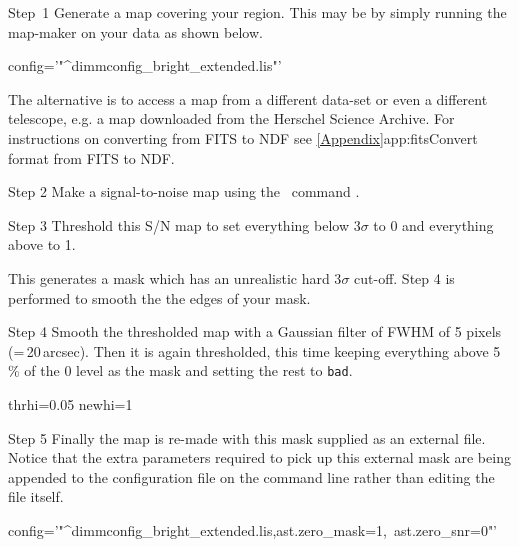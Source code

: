 \begin{aligndesc}
\item[Step~1] Generate a map covering your region. This may be by
  simply running the map-maker on your data as shown below.
\begin{terminalv}
          config='"^dimmconfig_bright_extended.lis"'
\end{terminalv}
The alternative is to access a map from a different data-set or even a
different telescope, e.g. a map downloaded from the Herschel Science
Archive. For instructions on converting from FITS to NDF see
\cref{Appendix}{app:fits}{Convert format from FITS to NDF}.\\

\item[Step 2] Make a signal-to-noise map using the \Kappa\ command
  \makesnr.
\begin{terminalv}
\end{terminalv}

\item[Step 3] Threshold this S/N map to set everything below
  3$\sigma$ to 0 and everything above to 1.
\begin{terminalv}
\end{terminalv}
This generates a mask which has an unrealistic hard 3$\sigma$
cut-off. Step 4 is performed to smooth the the edges of your mask.

\item[Step 4] Smooth the thresholded map with a Gaussian filter
  of FWHM of 5 pixels (=\,20\,arcsec). Then it is again thresholded,
  this time keeping everything above 5\,\% of the 0 level as the mask
  and setting the rest to \texttt{bad}.
\begin{terminalv}
  thrhi=0.05 newhi=1
\end{terminalv}

\item[Step 5] Finally the map is re-made with this mask supplied as an
  external file. Notice that the extra parameters required to pick up
  this external mask are being appended to the configuration file on
  the command line rather than editing the file itself.
\begin{terminalv}
          config='"^dimmconfig_bright_extended.lis,ast.zero_mask=1,\
                   ast.zero_snr=0"'
\end{terminalv}

\end{aligndesc}

